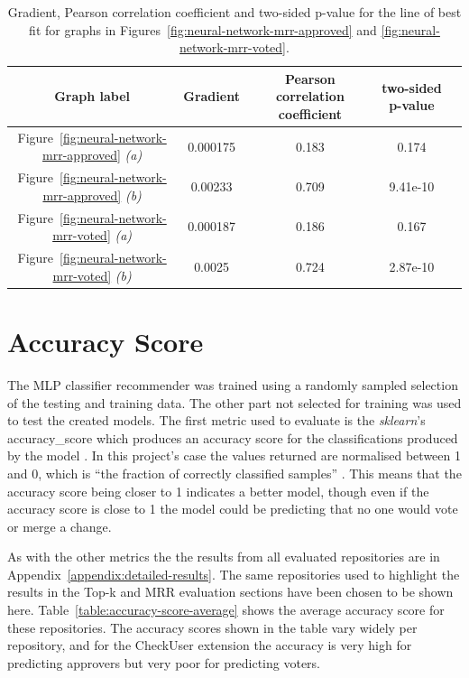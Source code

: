 \begin{table}[H]
    \centering
    \begin{tabular}{@{}c c c c c@{}} 
    \hline
    \textbf{Graph label} & \textbf{Gradient} & \textbf{Pearson correlation coefficient} & \textbf{two-sided p-value} \\
    \hline
Figure~\ref{fig:neural-network-mrr-approved} \emph{(a)} & 0.000175 & 0.183 & 0.174 \\
Figure~\ref{fig:neural-network-mrr-approved} \emph{(b)} & 0.00233 & 0.709 & 9.41e-10 \\
Figure~\ref{fig:neural-network-mrr-voted} \emph{(a)} & 0.000187 & 0.186 & 0.167 \\
Figure~\ref{fig:neural-network-mrr-voted} \emph{(b)} & 0.0025 & 0.724 & 2.87e-10 \\
    \hline
    \end{tabular}
    \caption{Gradient, Pearson correlation coefficient and two-sided p-value for the line of best fit for graphs in Figures~\ref{fig:neural-network-mrr-approved} and \ref{fig:neural-network-mrr-voted}.}
    \label{table:mrr-line-of-best-fit-stats-neural-network}
\end{table}


\section{Accuracy Score\label{section:accuracy-score}}
The MLP classifier recommender was trained using a randomly sampled selection of the testing and training data. The other part not selected for training was used to test the created models. The first metric used to evaluate is the \emph{sklearn}'s accuracy\_score which produces an accuracy score for the classifications produced by the model \citep{sklearn:accuracy-score}. In this project's case the values returned are normalised between 1 and 0, which is \enquote{the fraction of correctly classified samples} \citep{sklearn:accuracy-score}. This means that the accuracy score being closer to 1 indicates a better model, though even if the accuracy score is close to 1 the model could be predicting that no one would vote or merge a change.

As with the other metrics the the results from all evaluated repositories are in Appendix~\ref{appendix:detailed-results}. The same repositories used to highlight the results in the Top-k and MRR evaluation sections have been chosen to be shown here. Table~\ref{table:accuracy-score-average} shows the average accuracy score for these repositories. The accuracy scores shown in the table vary widely per repository, and for the CheckUser extension the accuracy is very high for predicting approvers but very poor for predicting voters.

